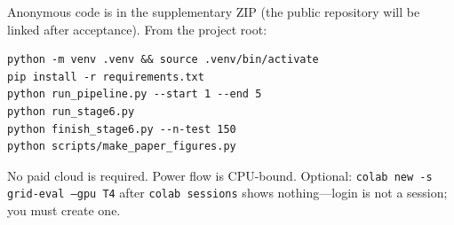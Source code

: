 \documentclass[11pt,a4paper]{article}
\begin{document}
Anonymous code is in the supplementary ZIP (the public repository will be linked after acceptance). From the project root:

\begin{verbatim}
python -m venv .venv && source .venv/bin/activate
pip install -r requirements.txt
python run_pipeline.py --start 1 --end 5
python run_stage6.py
python finish_stage6.py --n-test 150
python scripts/make_paper_figures.py
\end{verbatim}

No paid cloud is required. Power flow is CPU-bound. Optional: \texttt{colab new -s grid-eval --gpu T4} after \texttt{colab sessions} shows nothing---login is not a session; you must create one.
\end{document}
